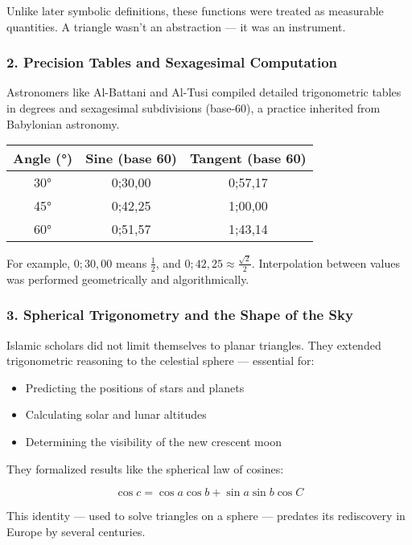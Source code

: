 Unlike later symbolic definitions, these functions were treated as measurable quantities. A triangle wasn’t an abstraction — it was an instrument.

\subsubsection*{2. Precision Tables and Sexagesimal Computation}

Astronomers like Al-Battani and Al-Tusi compiled detailed trigonometric tables in degrees and sexagesimal subdivisions (base-60), a practice inherited from Babylonian astronomy.

\begin{center}
\begin{tabular}{|c|c|c|}
\hline
\textbf{Angle (°)} & \textbf{Sine (base 60)} & \textbf{Tangent (base 60)} \\
\hline
30° & 0;30,00 & 0;57,17 \\
45° & 0;42,25 & 1;00,00 \\
60° & 0;51,57 & 1;43,14 \\
\hline
\end{tabular}
\end{center}

For example, \( 0;30,00 \) means \( \frac{1}{2} \), and \( 0;42,25 \approx \frac{\sqrt{2}}{2} \). Interpolation between values was performed geometrically and algorithmically.

\subsubsection*{3. Spherical Trigonometry and the Shape of the Sky}

Islamic scholars did not limit themselves to planar triangles. They extended trigonometric reasoning to the celestial sphere — essential for:

\begin{itemize}
    \item Predicting the positions of stars and planets
    \item Calculating solar and lunar altitudes
    \item Determining the visibility of the new crescent moon
\end{itemize}

They formalized results like the spherical law of cosines:

\[
\cos c = \cos a \cos b + \sin a \sin b \cos C
\]

This identity — used to solve triangles on a sphere — predates its rediscovery in Europe by several centuries.

